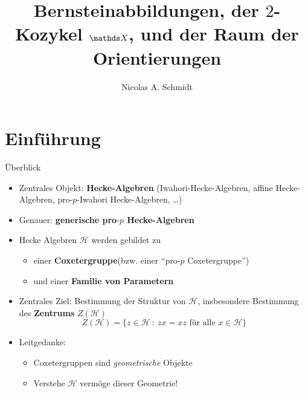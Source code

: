 \documentclass[pdf]{beamer}
\title{Bernsteinabbildungen, der $2$-Kozykel $\bbf{X}$, und der Raum der Orientierungen}
\author{Nicolas A. Schmidt}
\date{}
\begin{document}
\begin{frame}
   \titlepage
\end{frame}

\section{Einführung}
\begin{frame}{Überblick}
\begin{itemize}
   \item<2-> Zentrales Objekt: \textbf{Hecke-Algebren} \pause[3](Iwahori-Hecke-Algebren, affine Hecke-Algebren, pro-$p$-Iwahori Hecke-Algebren, \dots)
   \item<4->Genauer: \textbf{generische pro$\text{-}p$ Hecke-Algebren}
   \item<5-> Hecke Algebren $\mathcal{H}$ werden gebildet zu
      \begin{itemize}
         \item<6-> einer \textbf{Coxetergruppe}\pause[7] (bzw. einer ``pro-$p$ Coxetergruppe'')
         \item<8-> und einer \textbf{Familie von Parametern}
      \end{itemize}
   \item<9-> Zentrales Ziel: Bestimmung der Struktur von $\mathcal{H}$\pause[10], insbesondere Bestimmung des \textbf{Zentrums} $Z(\mathcal{H})$
      \pause[11]\[ Z(\mathcal{H}) = \{ z \in \mathcal{H}\ :\ zx = xz\text{ für alle } x \in \mathcal{H} \} \]
   \item<12-> Leitgedanke:
      \begin{itemize}
         \item<13-> Coxetergruppen sind \textit{geometrische} Objekte
         \item<14-> Verstehe $\mathcal{H}$ vermöge dieser Geometrie!
      \end{itemize}
\end{itemize}
\end{frame}
\end{document}
